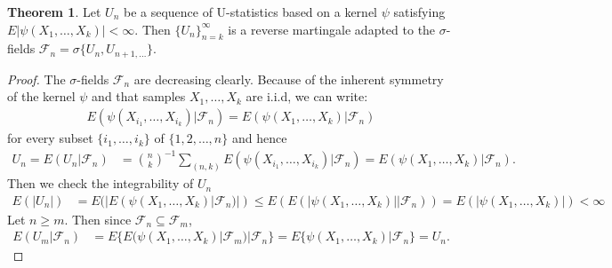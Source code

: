 \documentclass{article}
\theoremstyle{definition}
\newtheorem{theorem}{Theorem}
\numberwithin{Def}{section}
\begin{document}
\begin{theorem}
Let $U_n$ be a sequence of U-statistics based on a kernel $\psi$ satisfying $E|\psi(X_1, \dotsc, X_k)|<\infty$. Then $\{U_n\}_{n=k}^\infty$ is a reverse martingale adapted to the $\sigma$-fields $\mathcal{F}_n=\sigma\{U_n, U_{n+1,\dotsc}\}$.
\end{theorem}

\begin{proof}
The $\sigma$-fields $\mathcal{F}_n$ are decreasing clearly. Because of the inherent symmetry of the kernel $\psi$ and that samples $X_1, \dotsc, X_k$ are i.i.d, we can write:
\begin{align*}
    E(\psi (X_{i_1}, \dotsc, X_{i_k})|\mathcal{F}_n)=E(\psi (X_1, \dotsc, X_k)|\mathcal{F}_n)
\end{align*}
for every subset $\{i_1, \dotsc, i_k\}$ of $\{1,2,\dotsc,n\}$ and hence 
\begin{align*}
    U_n=E(U_n|\mathcal{F}_n)&={n\choose k}^{-1}\sum_{(n,k)}E(\psi(X_{i_1}, \dotsc,X_{i_k})|\mathcal{F}_n)
    =E(\psi(X_1,\dotsc,X_k)|\mathcal{F}_n).
\end{align*}
Then we check the integrability of $U_n$
\begin{align*}
E(|U_n|)&=E(|E(\psi(X_1,\dotsc,X_k)|\mathcal{F}_n)|)\le E(E(|\psi(X_1,\dotsc,X_k)||\mathcal{F}_n))
=E(|\psi(X_1,\dotsc, X_k)|)<\infty
\end{align*}
Let $n\ge m$. Then since $\mathcal{F}_n \subseteq \mathcal{F}_m$,
\begin{align*}
    E(U_m|\mathcal{F}_n)&=E\{E(\psi(X_1,\dotsc,X_k)|\mathcal{F}_m)|\mathcal{F}_n\}
    =E\{\psi(X_1,\dotsc,X_k)|\mathcal{F}_n\}
    =U_n.
\end{align*}
\end{proof}
\end{document}
